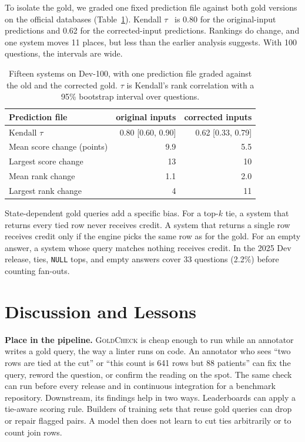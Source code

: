 \documentclass[conference]{IEEEtran}
\newcommand{\sys}{\textsc{GoldCheck}}
\begin{document}
To isolate the gold, we graded one fixed prediction file against both gold
versions on the official databases (Table~\ref{tab:rank}). Kendall $\tau$~\cite{kendall1938} is 0.80
for the original-input predictions and 0.62 for the corrected-input predictions.
Rankings do change, and one system moves 11 places, but less than the earlier
analysis suggests. With 100 questions, the intervals are wide.

\begin{table}[t]
\caption{Fifteen systems on Dev-100, with one prediction file graded against the
old and the corrected gold. $\tau$ is Kendall's rank correlation with a 95\%
bootstrap interval over questions.}
\label{tab:rank}
\centering
\footnotesize
\begin{tabular}{@{}lrr@{}}
\toprule
Prediction file & original inputs & corrected inputs \\
\midrule
Kendall $\tau$ & 0.80 [0.60, 0.90] & 0.62 [0.33, 0.79] \\
Mean score change (points) & 9.9 & 5.5 \\
Largest score change & 13 & 10 \\
Mean rank change & 1.1 & 2.0 \\
Largest rank change & 4 & 11 \\
\bottomrule
\end{tabular}
\end{table}

State-dependent gold queries add a specific bias. For a top-$k$ tie, a system
that returns every tied row never receives credit. A system that returns a single
row receives credit only if the engine picks the same row as for the gold. For an
empty answer, a system whose query matches nothing receives credit. In the 2025
Dev release, ties, \texttt{NULL} tops, and empty answers cover 33 questions
(2.2\%) before counting fan-outs.

\section{Discussion and Lessons}
\label{sec:discussion}

\textbf{Place in the pipeline.} \sys{} is cheap enough to run while an
annotator writes a gold query, the way a linter runs on code. An annotator who sees
``two rows are tied at the cut'' or ``this count is 641 rows but 88 patients''
can fix the query, reword the question, or confirm the reading on the spot. The
same check can run before every release and in continuous integration for a
benchmark repository. Downstream, its findings help in two ways. Leaderboards can apply a tie-aware scoring rule. Builders of training sets that
reuse gold queries can drop or repair flagged pairs. A model then does not
learn to cut ties arbitrarily or to count join rows.
\end{document}
